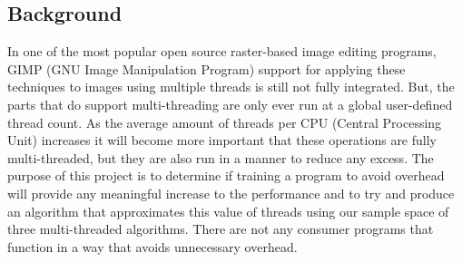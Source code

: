 \documentclass{article}
\begin{document}
\begin{multicols}{2}
            \subsection{Background}
                In one of the most popular open source raster-based image editing programs, GIMP (GNU Image Manipulation Program) support for applying these techniques to images using multiple threads is still not fully integrated.  But, the parts that do support multi-threading are only ever run at a global user-defined thread count.  As the average amount of threads per CPU (Central Processing Unit) increases it will become more important that these operations are fully multi-threaded, but they are also run in a manner to reduce any excess.  The purpose of this project is to determine if training a program to avoid overhead will provide any meaningful increase to the performance and to try and produce an algorithm that approximates this value of threads using our sample space of three multi-threaded algorithms.  There are not any consumer programs that function in a way that avoids unnecessary overhead.
        \end{multicols}
    
\end{document}

